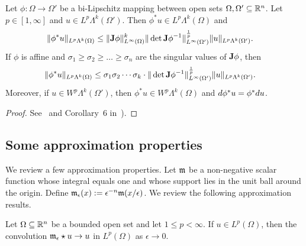 \documentclass[10pt,a4paper]{article}
\begin{document}
\begin{proposition}\label{proposition:pullbackestimate}
    Let $\phi : \Omega \rightarrow \Omega'$ be a bi-Lipschitz mapping between open sets $\Omega, \Omega' \subseteq {\mathbb R}^{n}$.
    Let $p \in [1,\infty]$ and $u \in L^{p}\Lambda^{k}(\Omega')$. 
    Then $\phi^{\ast} u \in L^{p}\Lambda^{k}(\Omega)$ and 
    \begin{align}
        \| \phi^{\ast} u \|_{L^{p}\Lambda^{k}(\Omega)}
        &\leq 
        \| {\mathbf{J}} \phi \|^{k}_{L^{\infty}(\Omega)}
        \| \det{\mathbf{J}} \phi^{-1} \|^{\frac{1}{p}}_{L^{\infty}(\Omega')}
        \| u \|_{L^{p}\Lambda^{k}(\Omega')}
        .
    \end{align}
    If $\phi$ is affine and $\sigma_1 \geq \sigma_2 \geq \dots \geq \sigma_n$ are the singular values of ${\mathbf{J}}\phi$, then 
    \begin{align}
        \| \phi^{\ast} u \|_{L^{p}\Lambda^{k}(\Omega)}
        &\leq 
        \sigma_1 \sigma_2 \cdots \sigma_k \cdot 
        \| \det{\mathbf{J}} \phi^{-1} \|^{\frac{1}{p}}_{L^{\infty}(\Omega')}
        \| u \|_{L^{p}\Lambda^{k}(\Omega')}
        .
    \end{align}
    Moreover, if $u \in W^{p}\Lambda^{k}(\Omega')$, then $\phi^{\ast} u \in W^{p}\Lambda^{k}(\Omega)$ and $d \phi^{\ast} u = \phi^{\ast} d u$. 
\end{proposition}
\begin{proof}
    See~\cite{licht2019smoothed} and Corollary~6 in~\cite{stern2013lp}).
\end{proof}




\subsection{Some approximation properties}

We review a few approximation properties. 
Let ${\mathfrak m}$ be a non-negative scalar function whose integral equals one and whose support lies in the unit ball around the origin.
Define ${\mathfrak m}_{\epsilon}(x) := \epsilon^{-n} {\mathfrak m}(x/\epsilon)$. We review the following approximation results.

\begin{lemma}
    Let $\Omega \subseteq {\mathbb R}^{n}$ be a bounded open set and let $1 \leq p < \infty$. 
    If $u \in L^{p}(\Omega)$, then the convolution ${\mathfrak m}_{\epsilon} \star u \rightarrow u$ in $L^{p}(\Omega)$ as $\epsilon \rightarrow 0$.
\end{lemma}
\end{document}
